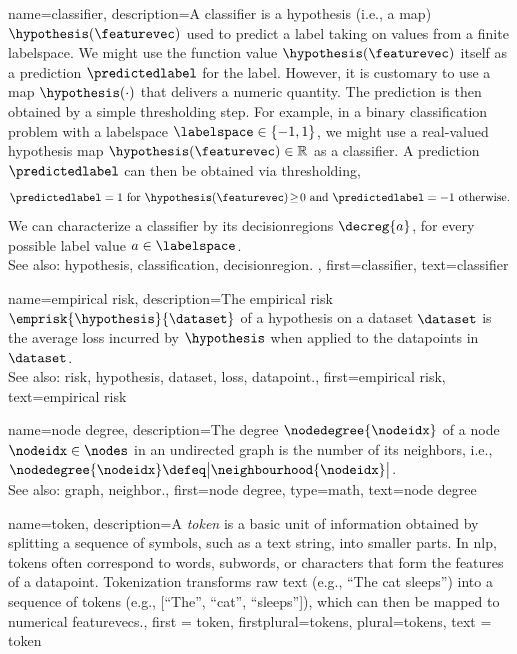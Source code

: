 {name={classifier},
	description={A classifier is a \gls{hypothesis} (i.e., a \gls{map}) $\hypothesis(\featurevec)$ 
		used to predict a \gls{label} taking on values from a finite \gls{labelspace}. We might use the 
		\gls{function} value $\hypothesis(\featurevec)$ itself as a \gls{prediction} $\predictedlabel$ for 
		the \gls{label}. However, it is customary to use a \gls{map} $\hypothesis(\cdot)$ that delivers 
		a numeric quantity. The \gls{prediction} is then obtained by a simple thresholding step. 
		For example, in a binary \gls{classification} problem with a \gls{labelspace} $\labelspace \in  \{ -1,1\}$, 
		we might use a real-valued \gls{hypothesis} \gls{map} $\hypothesis(\featurevec) \in \mathbb{R}$ 
		as a classifier. A \gls{prediction} $\predictedlabel$ can then be obtained via thresholding,  
		 \begin{equation} 
		 	\label{equ_def_threshold_bin_classifier_dict}
		 	\predictedlabel =1   \mbox{ for } \hypothesis(\featurevec)\!\geq\!0 \mbox{ and } 	\predictedlabel =-1  \mbox{ otherwise.}
	 		\end{equation}
 		We can characterize a classifier by its \glspl{decisionregion} $\decreg{a}$, for 
 		every possible \gls{label} value $a \in \labelspace$.
					\\ 
		See also: \gls{hypothesis}, \gls{classification}, \gls{decisionregion}. },
	first={classifier},
	text={classifier} 
}

{name={empirical risk},
  description={The empirical \gls{risk} $\emprisk{\hypothesis}{\dataset}$ 
  	of a \gls{hypothesis} on a \gls{dataset} $\dataset$ is the average \gls{loss} incurred 
  	by $\hypothesis$ when applied to the \glspl{datapoint} in $\dataset$.
				\\ 
		See also: \gls{risk}, \gls{hypothesis}, \gls{dataset}, \gls{loss}, \gls{datapoint}.},
  first={empirical risk},
  text={empirical risk} 
}

{name={node degree},
	description={The degree $\nodedegree{\nodeidx}$ of a 
	node $\nodeidx \in \nodes$ in an undirected \gls{graph} is the 
	number of its \glspl{neighbor}, i.e., $\nodedegree{\nodeidx} \defeq \big|\neighbourhood{\nodeidx}\big|$.
					\\ 
		See also: \gls{graph}, \gls{neighbor}.},
	first={node degree},
	type=math, 
	text={node degree} 
}

{name={token},
 description={A \textit{token} is a basic unit of information 
  obtained by splitting a sequence of symbols, such as a text string, 
  into smaller parts. In \gls{nlp}, tokens often correspond to words, subwords, 
  or characters that form the \glspl{feature} of a \gls{datapoint}. 
  Tokenization transforms raw text (e.g., ``The cat sleeps'') into a 
  sequence of tokens (e.g., [``The'', ``cat'', ``sleeps'']), which can
  then be mapped to numerical \glspl{featurevec}.}, 
  first = {token}, 
  firstplural={tokens}, 
  plural={tokens}, 
  text = {token}
}

